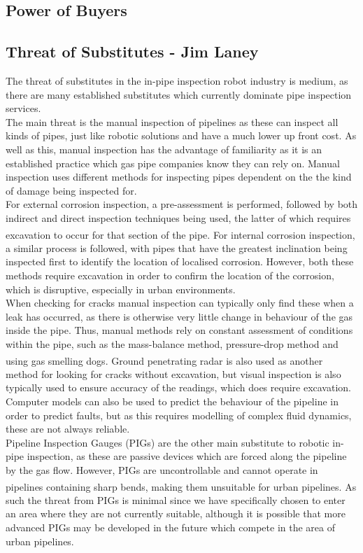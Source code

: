 \documentclass[11pt]{article}		%
\begin{document}
		\subsection[Power of Buyers]{Power of Buyers}
		
		\subsection[Threat of Substitutes]{Threat of Substitutes - Jim Laney}
			
			The threat of substitutes in the in-pipe inspection robot industry is medium, as there are many established substitutes which currently dominate pipe inspection services.
			\\
			The main threat is the manual inspection of pipelines as these can inspect all kinds of pipes, just like robotic solutions and have a much lower up front cost.
			As well as this, manual inspection has the advantage of familiarity as it is an established practice which gas pipe companies know they can rely on.
			Manual inspection uses different methods for inspecting pipes dependent on the the kind of damage being inspected for.
			\\
			For external corrosion inspection, a pre-assessment is performed, followed by both indirect and direct inspection techniques being used, the latter of which requires excavation to occur for that section of the pipe\textsuperscript{\cite{kishawy2010review}}. 
			For internal corrosion inspection, a similar process is followed, with pipes that have the greatest inclination being inspected first to identify the location of localised corrosion. 
			However, both these methods require excavation in order to confirm the location of the corrosion, which is disruptive, especially in urban environments.
			\\
			When checking for cracks manual inspection can typically only find these when a leak has occurred, as there is otherwise very little change in behaviour of the gas inside the pipe.
			Thus, manual methods rely on constant assessment of conditions within the pipe, such as the mass-balance method, pressure-drop method and using gas smelling dogs\textsuperscript{\cite{kishawy2010review}}.
			Ground penetrating radar is also used as another method for looking for cracks without excavation, but visual inspection is also typically used to ensure accuracy of the readings, which does require excavation.
			Computer models can also be used to predict the behaviour of the pipeline in order to predict faults, but as this requires modelling of complex fluid dynamics, these are not always reliable.
			\\
			Pipeline Inspection Gauges (PIGs) are the other main substitute to robotic in-pipe inspection, as these are passive devices which are forced along the pipeline by the gas flow.
			However, PIGs are uncontrollable and cannot operate in pipelines containing sharp bends\textsuperscript{\cite{mills2017advances}}, making them unsuitable for urban pipelines.
			As such the threat from PIGs is minimal since we have specifically chosen to enter an area where they are not currently suitable, although it is possible that more advanced PIGs may be developed in the future which compete in the area of urban pipelines.
		
\end{document}
